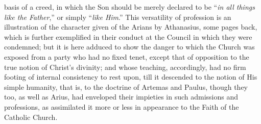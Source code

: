 basis of a creed, in which the Son should be merely declared to be
``\emph{in all things like the Father},'' or simply ``\emph{like
Him}.'' This versatility of profession is an illustration of
the character given of the Arians by Athanasius, some pages back,
which is further exemplified in their conduct at the Council in which
they were condemned; but it is here adduced to show the danger to
which the Church was exposed from a party who had no fixed tenet,
except that of opposition to the true notion of Christ's divinity; and
whose teaching, accordingly, had no firm footing of internal
consistency to rest upon, till it descended to the notion of His
simple humanity, that is, to the doctrine of Artemas and Paulus,
though they too, as well as Arius, had enveloped their impieties in
such admissions and professions, as assimilated it more or less in
appearance to the Faith of the Catholic Church.

